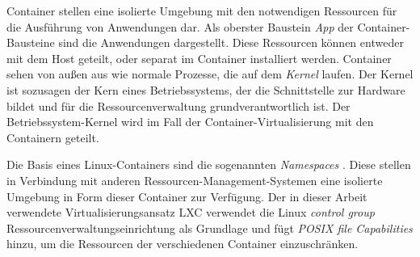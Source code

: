 Container stellen eine isolierte Umgebung mit den notwendigen Ressourcen für die Ausführung von Anwendungen dar. Als oberster Baustein \emph{App} der Container-Bausteine sind die Anwendungen dargestellt. Diese Ressourcen können entweder mit dem Host geteilt, oder separat im Container installiert werden. Container sehen von außen aus wie normale Prozesse, die auf dem \emph{Kernel} laufen. Der Kernel ist sozusagen der Kern eines Betriebssystems, der die Schnittstelle zur Hardware bildet und für die Ressourcenverwaltung grundverantwortlich ist. Der Betriebssystem-Kernel wird im Fall der Container-Virtualisierung mit den Containern geteilt. 

Die Basis eines Linux-Containers sind die sogenannten \emph{Namespaces} \cite{Also2018Man7.orgMan-pages}. Diese stellen in Verbindung mit anderen Ressourcen-Management-Systemen eine isolierte Umgebung in Form dieser Container zur Verfügung. Der in dieser Arbeit verwendete Virtualisierungsansatz LXC verwendet die Linux \emph{control group} \cite{Heo2015ControlV2} Ressourcenverwaltungseinrichtung als Grundlage und fügt \emph{POSIX file Capabilities} \cite{Overview2018PaperLinux-VServer} hinzu, um die Ressourcen der verschiedenen Container einzuschränken.







